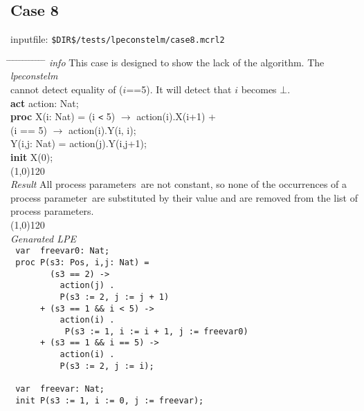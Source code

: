 \index{}\documentclass[a4paper,10pt]{article}
\theoremstyle{plain}
\theoremstyle{definition}
\newcommand{\tool}{\textit{lpeconstelm}}
\newcommand{\pp}{process parameter}
\newcommand{\pps}{process parameters}
\newcommand{\ti}{\textit}
\newcommand{\tb}{\textbf}
\newcommand{\tabw}{\hspace*{15.mm} \= \hspace*{20.mm} \= \hspace*{5.mm} \= \hspace*{5.mm} \= \hspace*{5.mm} \= \hspace*{5.mm}  \= \hspace*{5.mm}  \= \hspace*{5.mm}  \= \hspace*{5.mm} \= \hspace*{5.mm} \= \hspace*{5.mm}  \= \hspace*{5.mm}  \= \hspace*{5.mm}\kill}
\begin{document}
\subsection*{Case 8}
inputfile: \verb"$DIR$/tests/lpeconstelm/case8.mcrl2"
\begin{tabbing}
\tabw
\ti{info} \> This case is designed to show the lack of the algorithm. The \tool \ \\
	\> cannot detect equality of ($i$==5). It will detect that $i$ becomes $\bot$. \\ 
\tb{act} \> action: Nat;\\
\tb{proc} \> X(i: Nat)   = \>  (i \verb"<"  5) $\rightarrow$ action(i).X(i+1) +\\
                   \> (i == 5) $\rightarrow$ action(i).Y(i, i);\\
    \>  Y(i,j: Nat) = \>  action(j).Y(i,j+1);               \\
\tb{init} X(0);\\
\line(1,0){120}\\
\ti{Result} \> All \pps\ are not constant, so none of the occurrences of a \\
\> \pp\ are substituted by their value and are removed from the list of \\
\> \pps.\\
\line(1,0){120}\\
\ti{Genarated LPE} \\
\>  \verb" var  freevar0: Nat;"                              \\      %
\>  \verb" proc P(s3: Pos, i,j: Nat) = "                       \\    %
\>  \verb"        (s3 == 2) ->        "                        \\    %
\>  \verb"          action(j) .     "                          \\    %
\>  \verb"          P(s3 := 2, j := j + 1)"                    \\    %
\>  \verb"      + (s3 == 1 && i < 5) ->"                       \\    %
\>  \verb"          action(i) . "                              \\    %
\>  \verb"           P(s3 := 1, i := i + 1, j := freevar0) "   \\    %
\>  \verb"      + (s3 == 1 && i == 5) -> "                     \\    %
\>  \verb"          action(i) .       "                        \\    %
\>  \verb"          P(s3 := 2, j := i);"                       \\    %
\>  \verb"                            "                        \\    %
\>  \verb" var  freevar: Nat;      "                           \\    %
\>  \verb" init P(s3 := 1, i := 0, j := freevar);"             \\    %
\end{tabbing}
\newpage
\end{document}
